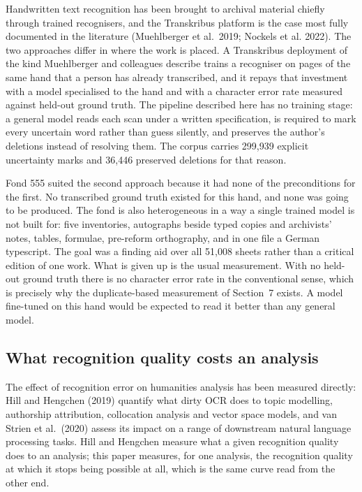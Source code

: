 \documentclass[11pt,a4paper]{article}
\begin{document}
Handwritten text recognition has been brought to archival material chiefly
through trained recognisers, and the Transkribus platform is the case most
fully documented in the literature (Muehlberger et al.~2019; Nockels et al.
2022). The two approaches differ in where the work is placed. A Transkribus
deployment of the kind Muehlberger and colleagues describe trains a recogniser
on pages of the same hand that a person has already transcribed, and it repays
that investment with a model specialised to the hand and with a character
error rate measured against held-out ground truth. The pipeline described here
has no training stage: a general model reads each scan under a written
specification, is required to mark every uncertain word rather than guess
silently, and preserves the author's deletions instead of resolving them. The
corpus carries 299,939 explicit uncertainty marks and 36,446 preserved
deletions for that reason.

Fond 555 suited the second approach because it had none of the preconditions
for the first. No transcribed ground truth existed for this hand, and none was
going to be produced. The fond is also heterogeneous in a way a single trained
model is not built for: five inventories, autographs beside typed copies and
archivists' notes, tables, formulae, pre-reform orthography, and in one file a
German typescript. The goal was a finding aid over all 51,008 sheets rather
than a critical edition of one work. What is given up is the usual
measurement. With no held-out ground truth there is no character error rate in
the conventional sense, which is precisely why the duplicate-based measurement
of Section~7 exists. A model fine-tuned on this hand would be expected to read
it better than any general model.

\subsection{What recognition quality costs an analysis}\label{what-recognition-quality-costs-an-analysis}

The effect of recognition error on humanities analysis has been measured
directly: Hill and Hengchen (2019) quantify what dirty OCR does to topic
modelling, authorship attribution, collocation analysis and vector space
models, and van Strien et al.~(2020) assess its impact on a range of
downstream natural language processing tasks. Hill and Hengchen measure what a
given recognition quality does to an analysis; this paper measures, for one
analysis, the recognition quality at which it stops being possible at all,
which is the same curve read from the other end.
\end{document}
